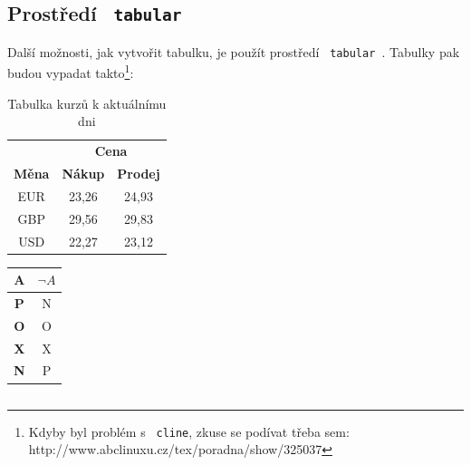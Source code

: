 \documentclass[a4paper,11pt]{article}
\begin{document}
\subsection{Prostředí \texttt{ tabular }}
    Další možnosti, jak vytvořit tabulku, je použít prostředí \texttt{ tabular }. Tabulky pak budou vypadat takto\footnote{Kdyby byl problém s \texttt{ cline}, zkuse se podívat třeba sem: http://www.abclinuxu.cz/tex/poradna/show/325037}:
    \begin{center}
        \begin{table}[h!]
            \centering
            \begin{tabular}{ |c|c|c| } 
            \hline
            & \multicolumn{2}{|c|}{\textbf{Cena}} \\ 
            \cline{2-3}
            \textbf{Měna} & \textbf{Nákup} & \textbf{Prodej} \\
            \hline
            EUR & 23,26 & 24,93 \\ 
            GBP & 29,56 & 29,83 \\ 
            USD & 22,27 & 23,12 \\ 
            \hline
            \end{tabular}
            \caption{Tabulka kurzů k aktuálnímu dni}
            \label{tab:kurzy}
        \end{table}
        \begin{table}[ht]
            \centering
            \begin{minipage}[t]{0.10\textwidth}
                \centering
                \begin{tabular}{|c|c|}
                \hline
                A & $\lnot A$ \\ 
                \hline
                \textbf{P} & N \\ 
                \hline
                \textbf{O} & O \\ 
                \hline
                \textbf{X} & X \\ 
                \hline
                \textbf{N} & P \\ 
                \hline
                \end{tabular}
                \label{tab:negace}
            \end{minipage}
            \hspace{0mm}
            \begin{minipage}[t]{0.25\textwidth}
                \centering
                \begin{tabular}{|c|c|c|c|c|c|}

\end{tabular}
\end{minipage}
\end{table}
\end{center}
\end{document}
